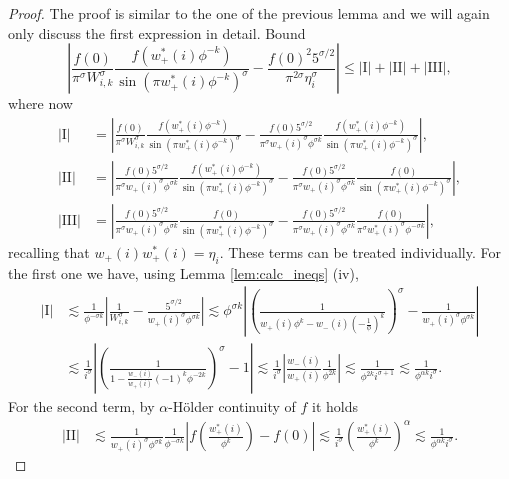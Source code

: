 \documentclass[]{interact}
\theoremstyle{definition}
\numberwithin{table}{section} %
\numberwithin{figure}{section}
\begin{document}
\begin{proof}
    The proof is similar to the one of the previous lemma and we will again only discuss the first expression in detail. Bound
    $$
    \left|\frac{f(0)}{\pi^\sigma W_{i, k}^\sigma} \frac{f(w_+^*(i) \phi^{-k})}{{\sin(\pi w_+^*(i) \phi^{-k})}^\sigma} - \frac{f(0)^2 5^{\sigma/2}}{\pi^{2\sigma} \eta_i^\sigma}\right| \leq |\text{I}|+|\text{II}|+|\text{III}|,
    $$
    where now
    \begin{align*}
        |\text{I}| & = \left|\frac{f(0)}{\pi^\sigma W_{i, k}^\sigma} \frac{f(w_+^*(i) \phi^{-k})}{{\sin(\pi w_+^*(i) \phi^{-k})}^\sigma} - \frac{f(0) 5^{\sigma/2}}{\pi^\sigma w_+(i)^\sigma \phi^{\sigma k}} \frac{f(w_+^*(i) \phi^{-k})}{{\sin(\pi w_+^*(i) \phi^{-k})}^\sigma}\right|, \\
        |\text{II}| & = \left|\frac{f(0) 5^{\sigma/2}}{\pi^\sigma w_+(i)^\sigma \phi^{\sigma k}} \frac{f(w_+^*(i) \phi^{-k})}{{\sin(\pi w_+^*(i) \phi^{-k})}^\sigma} - \frac{f(0) 5^{\sigma/2}}{\pi^\sigma w_+(i)^\sigma \phi^{\sigma k}} \frac{f(0)}{{\sin(\pi w_+^*(i) \phi^{-k})}^\sigma}\right|, \\
        |\text{III}| & = \left|\frac{f(0) 5^{\sigma/2}}{\pi^\sigma w_+(i)^\sigma \phi^{\sigma k}} \frac{f(0)}{{\sin(\pi w_+^*(i) \phi^{-k})}^\sigma} - \frac{f(0) 5^{\sigma/2}}{\pi^\sigma w_+(i)^\sigma \phi^{\sigma k}} \frac{f(0)}{\pi^\sigma w_+^*(i)^\sigma \phi^{-\sigma k}}\right|,
    \end{align*}
    recalling that $w_+(i) w_+^*(i) = \eta_i$. These terms can be treated individually. For the first one we have, using Lemma \ref{lem:calc_ineqs} (iv),
    \begin{align*}
        |\text{I}| & \lesssim \frac1{\phi^{-\sigma k}} \left|\frac{1}{W_{i, k}^\sigma} - \frac{5^{\sigma/2}}{w_+(i)^\sigma \phi^{\sigma k}}\right| \lesssim \phi^{\sigma k} \left|\left(\frac1{w_+(i) \phi^k - w_-(i) \left(-\frac1\phi\right)^k}\right)^\sigma - \frac1{w_+(i)^\sigma \phi^{\sigma k}}\right| \\
        & \lesssim \frac1{i^\sigma} \left|\left(\frac{1}{1- \frac{w_-(i)}{w_+(i)} (-1)^k \phi^{-2k}}\right)^\sigma - 1\right| \lesssim \frac1{i^\sigma} \left|\frac{w_-(i)}{w_+(i)} \frac1{\phi^{2k}}\right| \lesssim \frac1{\phi^{2k} i^{\sigma+1}} \lesssim \frac1{\phi^{\alpha k} i^\sigma}.
    \end{align*}
    For the second term, by $\alpha$-Hölder continuity of $f$ it holds
    \begin{align*}
        |\text{II}| & \lesssim \frac1{w_+(i)^\sigma \phi^{\sigma k}} \frac1{\phi^{-\sigma k}} \left|f\left(\frac{w_+^*(i)}{\phi^k}\right) - f(0)\right| \lesssim \frac1{i^\sigma} \left(\frac{w_+^*(i)}{\phi^k}\right)^\alpha \lesssim \frac1{\phi^{\alpha k} i^\sigma}.

\end{align*}
\end{proof}
\end{document}
